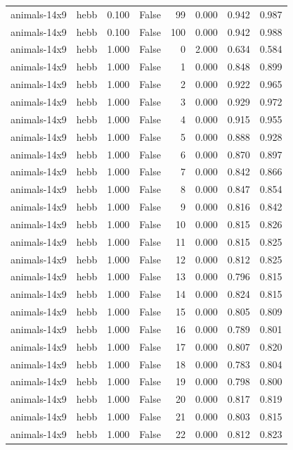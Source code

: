 \begin{tabular}{llrrrrrr}
animals-14x9 & hebb & 0.100 & False & 99 & 0.000 & 0.942 & 0.987 \\
animals-14x9 & hebb & 0.100 & False & 100 & 0.000 & 0.942 & 0.988 \\
animals-14x9 & hebb & 1.000 & False & 0 & 2.000 & 0.634 & 0.584 \\
animals-14x9 & hebb & 1.000 & False & 1 & 0.000 & 0.848 & 0.899 \\
animals-14x9 & hebb & 1.000 & False & 2 & 0.000 & 0.922 & 0.965 \\
animals-14x9 & hebb & 1.000 & False & 3 & 0.000 & 0.929 & 0.972 \\
animals-14x9 & hebb & 1.000 & False & 4 & 0.000 & 0.915 & 0.955 \\
animals-14x9 & hebb & 1.000 & False & 5 & 0.000 & 0.888 & 0.928 \\
animals-14x9 & hebb & 1.000 & False & 6 & 0.000 & 0.870 & 0.897 \\
animals-14x9 & hebb & 1.000 & False & 7 & 0.000 & 0.842 & 0.866 \\
animals-14x9 & hebb & 1.000 & False & 8 & 0.000 & 0.847 & 0.854 \\
animals-14x9 & hebb & 1.000 & False & 9 & 0.000 & 0.816 & 0.842 \\
animals-14x9 & hebb & 1.000 & False & 10 & 0.000 & 0.815 & 0.826 \\
animals-14x9 & hebb & 1.000 & False & 11 & 0.000 & 0.815 & 0.825 \\
animals-14x9 & hebb & 1.000 & False & 12 & 0.000 & 0.812 & 0.825 \\
animals-14x9 & hebb & 1.000 & False & 13 & 0.000 & 0.796 & 0.815 \\
animals-14x9 & hebb & 1.000 & False & 14 & 0.000 & 0.824 & 0.815 \\
animals-14x9 & hebb & 1.000 & False & 15 & 0.000 & 0.805 & 0.809 \\
animals-14x9 & hebb & 1.000 & False & 16 & 0.000 & 0.789 & 0.801 \\
animals-14x9 & hebb & 1.000 & False & 17 & 0.000 & 0.807 & 0.820 \\
animals-14x9 & hebb & 1.000 & False & 18 & 0.000 & 0.783 & 0.804 \\
animals-14x9 & hebb & 1.000 & False & 19 & 0.000 & 0.798 & 0.800 \\
animals-14x9 & hebb & 1.000 & False & 20 & 0.000 & 0.817 & 0.819 \\
animals-14x9 & hebb & 1.000 & False & 21 & 0.000 & 0.803 & 0.815 \\
animals-14x9 & hebb & 1.000 & False & 22 & 0.000 & 0.812 & 0.823 \\

\end{tabular}
